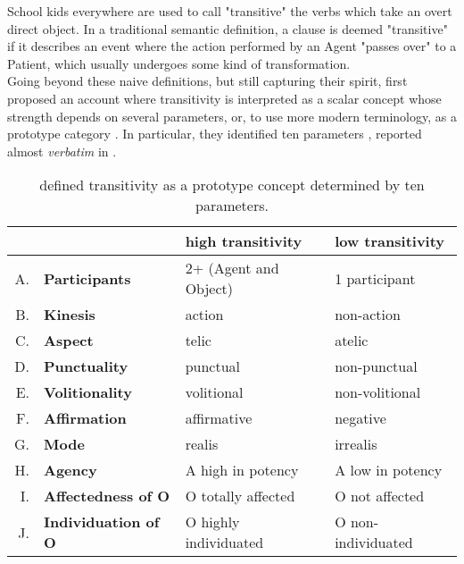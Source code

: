 School kids everywhere are used to call "transitive" the verbs which take an overt direct object. In a traditional semantic definition, a clause is deemed "transitive" if it describes an event where the action performed by an Agent "passes over" to a Patient, which usually undergoes some kind of transformation.\\
Going beyond these naive definitions, but still capturing their spirit, \textcite{HopperThompson1980} first proposed an account where transitivity is interpreted as a scalar concept whose strength depends on several parameters, or, to use more modern terminology, as a prototype category \parencite{Naess2007}. In particular, they identified ten parameters \parencite[252]{HopperThompson1980}, reported almost \textit{verbatim} in .

\begin{table}[htb] %
\caption{\textcite[252]{HopperThompson1980} defined transitivity as a prototype concept determined by ten parameters.}
\begin{tabular}{rl|ll}
 & & \textbf{high transitivity} & \textbf{low transitivity} \\
 \hline
A. & \textbf{Participants} & 2+ (Agent and Object)  & 1 participant  \\
B. & \textbf{Kinesis} & action  & non-action  \\
C. & \textbf{Aspect} & telic  & atelic  \\
D. & \textbf{Punctuality} & punctual  & non-punctual  \\
E. & \textbf{Volitionality} & volitional  & non-volitional  \\
F. & \textbf{Affirmation} & affirmative  & negative  \\
G. & \textbf{Mode} & realis  & irrealis  \\
H. & \textbf{Agency} & A high in potency  & A low in potency   \\
I. & \textbf{Affectedness of O} & O totally affected  & O not affected  \\
J. & \textbf{Individuation of O} & O highly individuated  & O non-individuated  
\end{tabular}
\end{table}

